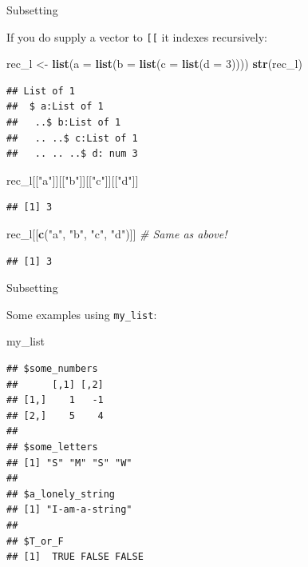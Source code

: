 \documentclass[ignorenonframetext,]{beamer}
\newenvironment{Shaded}{\begin{snugshade}}{\end{snugshade}}
\newcommand{\CommentTok}[1]{\textcolor[rgb]{0.56,0.35,0.01}{\textit{#1}}}
\newcommand{\DataTypeTok}[1]{\textcolor[rgb]{0.13,0.29,0.53}{#1}}
\newcommand{\DecValTok}[1]{\textcolor[rgb]{0.00,0.00,0.81}{#1}}
\newcommand{\KeywordTok}[1]{\textcolor[rgb]{0.13,0.29,0.53}{\textbf{#1}}}
\newcommand{\NormalTok}[1]{#1}
\newcommand{\StringTok}[1]{\textcolor[rgb]{0.31,0.60,0.02}{#1}}
\begin{document}
\begin{frame}[fragile]{Subsetting}
\protect\hypertarget{subsetting-5}{}

If you do supply a vector to \texttt{{[}{[}} it indexes recursively:

\begin{Shaded}
\begin{Highlighting}[]
\NormalTok{rec_l <-}\StringTok{ }\KeywordTok{list}\NormalTok{(}\DataTypeTok{a =} \KeywordTok{list}\NormalTok{(}\DataTypeTok{b =} \KeywordTok{list}\NormalTok{(}\DataTypeTok{c =} \KeywordTok{list}\NormalTok{(}\DataTypeTok{d =} \DecValTok{3}\NormalTok{))))}
\KeywordTok{str}\NormalTok{(rec_l)}
\end{Highlighting}
\end{Shaded}

\begin{verbatim}
## List of 1
##  $ a:List of 1
##   ..$ b:List of 1
##   .. ..$ c:List of 1
##   .. .. ..$ d: num 3
\end{verbatim}

\begin{Shaded}
\begin{Highlighting}[]
\NormalTok{rec_l[[}\StringTok{"a"}\NormalTok{]][[}\StringTok{"b"}\NormalTok{]][[}\StringTok{"c"}\NormalTok{]][[}\StringTok{"d"}\NormalTok{]] }
\end{Highlighting}
\end{Shaded}

\begin{verbatim}
## [1] 3
\end{verbatim}

\begin{Shaded}
\begin{Highlighting}[]
\NormalTok{rec_l[[}\KeywordTok{c}\NormalTok{(}\StringTok{"a"}\NormalTok{, }\StringTok{"b"}\NormalTok{, }\StringTok{"c"}\NormalTok{, }\StringTok{"d"}\NormalTok{)]] }\CommentTok{# Same as above!}
\end{Highlighting}
\end{Shaded}

\begin{verbatim}
## [1] 3
\end{verbatim}

\end{frame}

\begin{frame}[fragile]{Subsetting}
\protect\hypertarget{subsetting-6}{}

Some examples using \texttt{my\_list}:

\begin{Shaded}
\begin{Highlighting}[]
\NormalTok{my_list}
\end{Highlighting}
\end{Shaded}

\begin{verbatim}
## $some_numbers
##      [,1] [,2]
## [1,]    1   -1
## [2,]    5    4
## 
## $some_letters
## [1] "S" "M" "S" "W"
## 
## $a_lonely_string
## [1] "I-am-a-string"
## 
## $T_or_F
## [1]  TRUE FALSE FALSE
\end{verbatim}

\end{frame}
\end{document}
